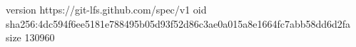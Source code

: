 version https://git-lfs.github.com/spec/v1
oid sha256:4dc594f6ee5181e788495b05d93f52d86c3ae0a015a8e1664fc7abb58dd6d2fa
size 130960

